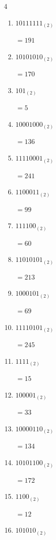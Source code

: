 \begin{multicols}{4}
\begin{enumerate}
        $=243$

  \item $10111111_{(2)}$

        $=191$

  \item $10101010_{(2)}$

        $=170$

  \item $101_{(2)}$

        $=5$

  \item $10001000_{(2)}$

        $=136$

  \item $11110001_{(2)}$

        $=241$

  \item $1100011_{(2)}$

        $=99$

  \item $111100_{(2)}$

        $=60$

  \item $11010101_{(2)}$

        $=213$

\columnbreak %

  \item $1000101_{(2)}$

        $=69$

  \item $11110101_{(2)}$

        $=245$

  \item $1111_{(2)}$

        $=15$

  \item $100001_{(2)}$

        $=33$

  \item $10000110_{(2)}$

        $=134$

  \item $10101100_{(2)}$

        $=172$

  \item $1100_{(2)}$

        $=12$

  \item $101010_{(2)}$


\end{enumerate}
\end{multicols}

